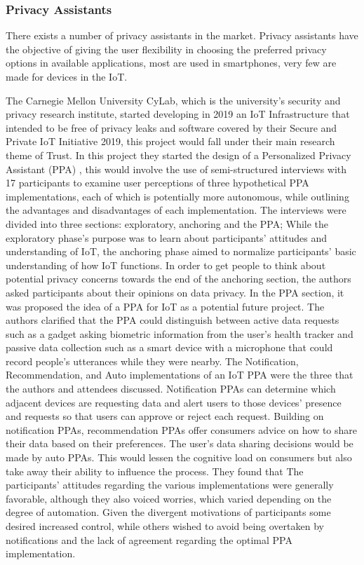\documentclass[conference]{IEEEtran}
\begin{document}
\subsubsection{Privacy Assistants}

There exists a number of privacy assistants in the market. Privacy assistants
have the objective of giving the user flexibility in choosing the preferred
privacy options in available applications, most are used in smartphones,
very few are made for devices in the IoT.

The Carnegie Mellon University CyLab, which is the university's security
and privacy research institute, started developing in 2019 an IoT Infrastructure
that intended to be free of privacy leaks and software covered by their
Secure and Private IoT Initiative 2019, this project would fall under
their main research theme of Trust. In this project they started the design
of a Personalized Privacy Assistant (PPA) \cite{ColnagoInforming}, this
would involve the use of semi-structured interviews with 17 participants
to examine user perceptions of three hypothetical PPA implementations,
each of which is potentially more autonomous, while outlining the advantages
and disadvantages of each implementation. The interviews were divided into
three sections: exploratory, anchoring and the PPA; While the exploratory
phase's purpose was to learn about participants' attitudes and understanding
of IoT, the anchoring phase aimed to normalize participants' basic understanding
of how IoT functions. In order to get people to think about potential privacy
concerns towards the end of the anchoring section, the authors asked participants
about their opinions on data privacy. In the PPA section, it was proposed
the idea of a PPA for IoT as a potential future project. The authors clarified
that the PPA could distinguish between active data requests such as a gadget
asking biometric information from the user's health tracker and passive data
collection such as a smart device with a microphone that could record people's
utterances while they were nearby. The Notification, Recommendation, and
Auto implementations of an IoT PPA were the three that the authors and attendees
discussed. Notification PPAs can determine which adjacent devices are requesting
data and alert users to those devices' presence and requests so that users
can approve or reject each request. Building on notification PPAs, recommendation
PPAs offer consumers advice on how to share their data based on their preferences.
The user's data sharing decisions would be made by auto PPAs. This would
lessen the cognitive load on consumers but also take away their ability to
influence the process. They found that The participants' attitudes regarding
the various implementations were generally favorable, although they also
voiced worries, which varied depending on the degree of automation. Given
the divergent motivations of participants some desired increased control,
while others wished to avoid being overtaken by notifications and the lack
of agreement regarding the optimal PPA implementation.
\end{document}
